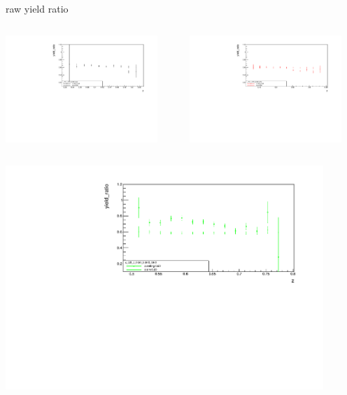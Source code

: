\begin{frame}{raw yield ratio}
\begin{columns}
\begin{column}[T]{0.5\textwidth}
\includegraphics[width = 0.9\textwidth]{results/yield/statistics/x_Q2_z_0.50_5.500_0.40_ratio.pdf}
\end{column}
\begin{column}[T]{0.5\textwidth}
\includegraphics[width = 0.9\textwidth]{results/yield/statistics/x_Q2_z_0.50_5.500_0.50_ratio.pdf}
\end{column}
\end{columns}
\begin{columns}
\begin{column}[T]{0.5\textwidth}
\includegraphics[width = 0.9\textwidth]{results/yield/statistics/x_Q2_z_0.50_5.500_0.60_ratio.pdf}

\end{column}
\end{columns}
\end{frame}
